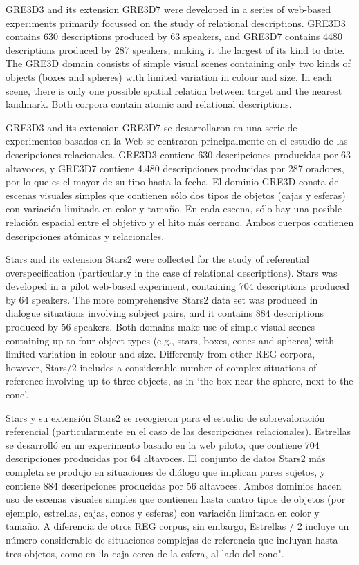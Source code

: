 GRE3D3 and its extension GRE3D7 \cite{gre3d3,gre3d7} were developed in a series of web-based experiments primarily focussed on the study of relational descriptions. GRE3D3 contains 630 descriptions produced by 63 speakers, and GRE3D7 contains 4480 descriptions produced by 287 speakers, making it the largest of its kind to date. The GRE3D domain consists of simple visual scenes containing only two kinds of objects (boxes and spheres) with limited variation in colour and size. In each scene, there is only one possible spatial relation between target and the nearest landmark. Both corpora contain atomic and relational descriptions.


GRE3D3 and its extension GRE3D7 \cite{gre3d3,gre3d7}
se desarrollaron en una serie de experimentos basados en la Web se centraron principalmente en el estudio de las descripciones relacionales. GRE3D3 contiene 630 descripciones producidas por 63 altavoces, y GRE3D7 contiene 4.480 descripciones producidas por 287 oradores, por lo que es el mayor de su tipo hasta la fecha. El dominio GRE3D consta de escenas visuales simples que contienen s\'olo dos tipos de objetos (cajas y esferas) con variaci\'on limitada en color y tama\~no. En cada escena, s\'olo hay una posible relaci\'on espacial entre el objetivo y el hito m\'as cercano. Ambos cuerpos contienen descripciones at\'omicas y relacionales.

Stars \cite{stars-mutual-disamb} and its extension Stars2 were collected for the study of referential overspecification (particularly in the case of relational descriptions). Stars was developed in a pilot web-based experiment, containing 704 descriptions produced by 64 speakers.  The more comprehensive Stars2 data set was produced in dialogue situations involving subject pairs, and it contains 884 descriptions produced by 56 speakers. Both domains make use of simple visual scenes containing up to four object types (e.g., stars, boxes, cones and spheres) with limited variation in colour and size. Differently from other REG corpora, however, Stars/2 includes a considerable number of complex situations of reference involving up to three objects, as in `the box near the sphere, next to the cone'. 


Stars \cite{stars-mutual-disamb} y su extensi\'on Stars2 se recogieron para el estudio de sobrevaloraci\'on referencial (particularmente en el caso de las descripciones relacionales). Estrellas se desarroll\'o en un experimento basado en la web piloto, que contiene 704 descripciones producidas por 64 altavoces. El conjunto de datos Stars2 m\'as completa se produjo en situaciones de di\'alogo que implican pares sujetos, y contiene 884 descripciones producidas por 56 altavoces. Ambos dominios hacen uso de escenas visuales simples que contienen hasta cuatro tipos de objetos (por ejemplo, estrellas, cajas, conos y esferas) con variaci\'on limitada en color y tama\~no. A diferencia de otros REG corpus, sin embargo, Estrellas / 2 incluye un n\'umero considerable de situaciones complejas de referencia que incluyan hasta tres objetos, como en `la caja cerca de la esfera, al lado del cono".


